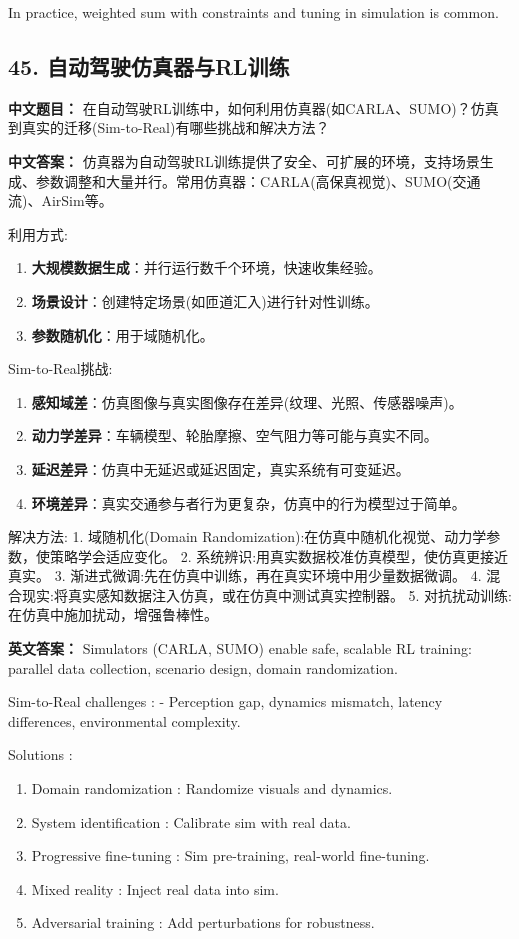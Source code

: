 \documentclass[10pt,a4paper]{ctexart}
\begin{document}
In practice, weighted sum with constraints and tuning in simulation is common.

\subsection*{45. 自动驾驶仿真器与RL训练}
\textbf{中文题目：} 在自动驾驶RL训练中，如何利用仿真器(如CARLA、SUMO)？仿真到真实的迁移(Sim-to-Real)有哪些挑战和解决方法？

\textbf{中文答案：}  
仿真器为自动驾驶RL训练提供了安全、可扩展的环境，支持场景生成、参数调整和大量并行。常用仿真器：CARLA(高保真视觉)、SUMO(交通流)、AirSim等。

 利用方式:
\begin{enumerate}
    \item \textbf{大规模数据生成}：并行运行数千个环境，快速收集经验。
    \item \textbf{场景设计}：创建特定场景(如匝道汇入)进行针对性训练。
    \item \textbf{参数随机化}：用于域随机化。
\end{enumerate}

 Sim-to-Real挑战:
\begin{enumerate}
    \item \textbf{感知域差}：仿真图像与真实图像存在差异(纹理、光照、传感器噪声)。
    \item \textbf{动力学差异}：车辆模型、轮胎摩擦、空气阻力等可能与真实不同。
    \item \textbf{延迟差异}：仿真中无延迟或延迟固定，真实系统有可变延迟。
    \item \textbf{环境差异}：真实交通参与者行为更复杂，仿真中的行为模型过于简单。
\end{enumerate}

 解决方法:
1.  域随机化(Domain Randomization):在仿真中随机化视觉、动力学参数，使策略学会适应变化。
2.  系统辨识:用真实数据校准仿真模型，使仿真更接近真实。
3.  渐进式微调:先在仿真中训练，再在真实环境中用少量数据微调。
4.  混合现实:将真实感知数据注入仿真，或在仿真中测试真实控制器。
5.  对抗扰动训练:在仿真中施加扰动，增强鲁棒性。

\textbf{英文答案：}  
Simulators (CARLA, SUMO) enable safe, scalable RL training: parallel data collection, scenario design, domain randomization.

 Sim-to-Real challenges :
- Perception gap, dynamics mismatch, latency differences, environmental complexity.

 Solutions :
\begin{enumerate}
    \item Domain randomization : Randomize visuals and dynamics.
    \item System identification : Calibrate sim with real data.
    \item Progressive fine-tuning : Sim pre-training, real-world fine-tuning.
    \item Mixed reality : Inject real data into sim.
    \item Adversarial training : Add perturbations for robustness.
\end{enumerate}
\end{document}
